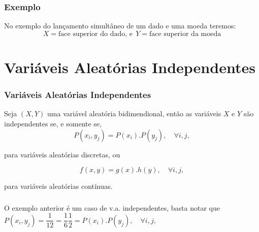 \documentclass[14pt,aspectratio=1610]{beamer}
\begin{document}
\begin{frame}{}
\frametitle{Exemplo}
\begin{block}{}
No exemplo do lançamento simultâneo de um dado e uma moeda teremos:
$$X= \textrm{face superior do dado,\ e}\ \ Y=\textrm{face superior da moeda}$$
\begin{table}[h]
\centering
{}
\end{table}
\end{block}
\end{frame}

\section{Variáveis Aleatórias Independentes}
\begin{frame}{}
\frametitle{Variáveis Aleatórias Independentes}
\begin{block}{}
\justifying
Seja $(X, Y)$ uma variável aleatória bidimendional, então as variáveis $X$ e $Y$
são independentes se, e somente se, 
$$P(x_{i}, y_{j}) = P(x_{i}).P (y_{j}),\quad \forall i,j,$$

para variáveis aleatórias discretas, ou 

$$f(x, y) = g(x).h(y),\quad \forall i,j,$$

para variáveis aleatórias contínuas. 

\end{block}
\end{frame}

\begin{frame}{}
\frametitle{}
\begin{block}{}
\justifying
O exemplo anterior é um caso de v.a. independentes, basta notar que 
$P(x_{i}, y_{j}) =\dfrac{1}{12}= \dfrac{1}{6}\dfrac{1}{2}=P(x_{i}).P (y_{j}),\quad \forall i,j,$
\end{block}
\end{frame}
\end{document}
